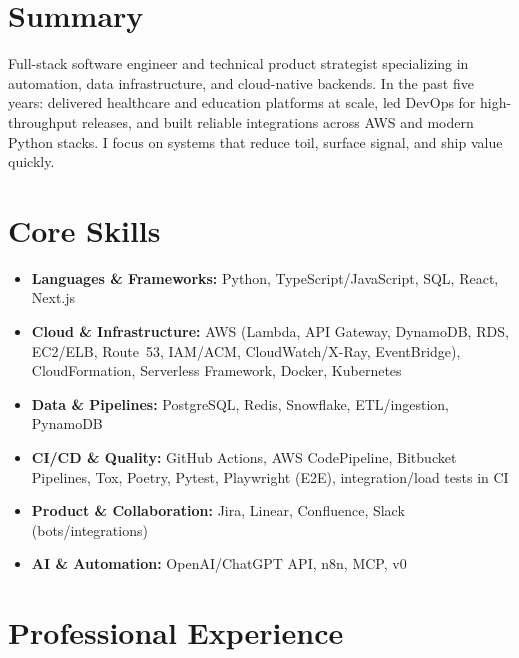 \documentclass[10pt]{article}
\begin{document}

\section*{Summary}
Full-stack software engineer and technical product strategist specializing in automation, data infrastructure, and cloud-native backends. In the past five years: delivered healthcare and education platforms at scale, led DevOps for high-throughput releases, and built reliable integrations across AWS and modern Python stacks. I focus on systems that reduce toil, surface signal, and ship value quickly.

\section*{Core Skills}
\begin{itemize}[leftmargin=*]
  \item \textbf{Languages \& Frameworks:} Python, TypeScript/JavaScript, SQL, React, Next.js
  \item \textbf{Cloud \& Infrastructure:} AWS (Lambda, API Gateway, DynamoDB, RDS, EC2/ELB, Route~53, IAM/ACM, CloudWatch/X-Ray, EventBridge), CloudFormation, Serverless Framework, Docker, Kubernetes
  \item \textbf{Data \& Pipelines:} PostgreSQL, Redis, Snowflake, ETL/ingestion, PynamoDB
  \item \textbf{CI/CD \& Quality:} GitHub Actions, AWS CodePipeline, Bitbucket Pipelines, Tox, Poetry, Pytest, Playwright (E2E), integration/load tests in CI
  \item \textbf{Product \& Collaboration:} Jira, Linear, Confluence, Slack (bots/integrations)
  \item \textbf{AI \& Automation:} OpenAI/ChatGPT API, n8n, MCP, v0
\end{itemize}

\section*{Professional Experience}
\end{document}
